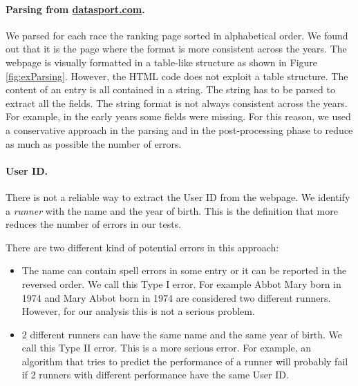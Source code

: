 \documentclass[fleqn,10pt]{wlscirep}
\begin{document}
        \paragraph{Parsing from \url{datasport.com}.}
        We parsed for each race the ranking page sorted in alphabetical order. We found out that it
        is the page where the format is more consistent across the years.
        The webpage is visually formatted in a table-like structure as shown in Figure \ref{fig:exParsing}.
        However, the HTML code does not exploit a table structure. The content of an entry
        is all contained in a string. The string has to be parsed to extract all the fields.
        The string format is not always consistent across the years.
        For example, in the early years some fields were missing.
        For this reason, we used a conservative approach in the parsing and in the post-processing phase 
        to reduce as much as possible the number of errors. 

        \paragraph{User ID.} There is not a reliable way to extract the User ID from the webpage.
        We identify a \textit{runner} with the name and the year of birth. 
        This is the definition
        that more reduces the number of errors in our tests.

        There are two different kind of potential errors in this approach:
        \begin{itemize} 
                \item The name can contain spell errors in some entry or it can be reported in the 
                    reversed order. We call this Type I error.
                    For example Abbot Mary born in 1974 and Mary Abbot born in
                    1974 are considered two different runners.
                    However, for our analysis this is not a serious problem.
                \item 2 different runners can have the same name and the same year of birth.
                    We call this Type II error.
                    This is a more serious error. 
                    For example, an algorithm that tries to predict the performance of a runner
                    will probably fail if 2 runners with different performance have
                    the same User ID.
        \end{itemize}
\end{document}
